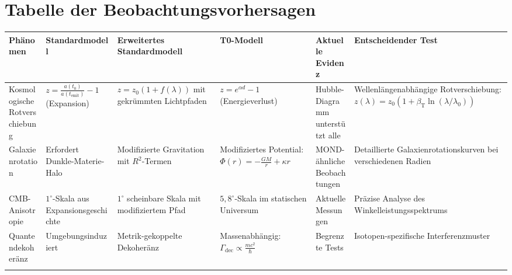 \documentclass[12pt,a4paper]{article}
\newcommand{\betaT}{\beta_{\text{T}}}
\begin{document}
	\section{Tabelle der Beobachtungsvorhersagen}
\begin{table}[htbp]
	\centering
	\footnotesize %
	\renewcommand{\arraystretch}{1.2} %
	\begin{tabular}{>{\raggedright\arraybackslash}p{} 
			>{\raggedright\arraybackslash}p{} 
			>{\raggedright\arraybackslash}p{} 
			>{\raggedright\arraybackslash}p{} 
			>{\raggedright\arraybackslash}p{} 
			>{\raggedright\arraybackslash}p{}}
		\toprule
		\textbf{Phänomen} & \textbf{Standard\-modell} & \textbf{Erweitertes Standard\-modell} & \textbf{T0-Modell} & \textbf{Aktuelle Evidenz} & \textbf{Entscheidender Test} \\
		\midrule
		Kosmologische Rot\-verschiebung & 
		$z = \frac{a(t_0)}{a(t_{\text{emit}})} - 1$ \newline(Expansion) & 
		$z = z_0 (1 + f(\lambda))$ \newline mit gekrümmten Lichtpfaden & 
		$z = e^{\alpha d} - 1$ \newline(Energieverlust) & 
		Hubble-Diagramm unterstützt alle & 
		Wellenlängen\-abhängige Rotverschiebung: \newline$z(\lambda) = z_0 (1 + \betaT \ln(\lambda / \lambda_0))$ \\
		\addlinespace[0.5em]
		
		Galaxien\-rotation & 
		Erfordert Dunkle-Materie-Halo & 
		Modifizierte Gravitation mit $R^2$-Termen & 
		Modifiziertes Potential: \newline$\Phi(r) = -\frac{GM}{r} + \kappa r$ & 
		MOND-ähnliche Beobachtungen & 
		Detaillierte Galaxien\-rotations\-kurven bei verschiedenen Radien \\
		\addlinespace[0.5em]
		
		CMB-Anisotropie & 
		$1^\circ$-Skala aus Expansions\-geschichte & 
		$1^\circ$ scheinbare Skala mit modifiziertem Pfad & 
		$5,8^\circ$-Skala im statischen Universum & 
		Aktuelle Messungen & 
		Präzise Analyse des Winkel\-leistungs\-spektrums \\
		\addlinespace[0.5em]
		
		Quanten\-dekoheränz & 
		Umgebungs\-induziert & 
		Metrik-gekoppelte Dekoheränz & 
		Massenabhängig: \newline$\Gamma_{\text{dec}} \propto \frac{m c^2}{\hbar}$ & 
		Begrenzte Tests & 
		Isotopen-spezifische Interferenz\-muster \\
		\addlinespace[0.5em]
		

\end{tabular}
\end{table}
\end{document}
